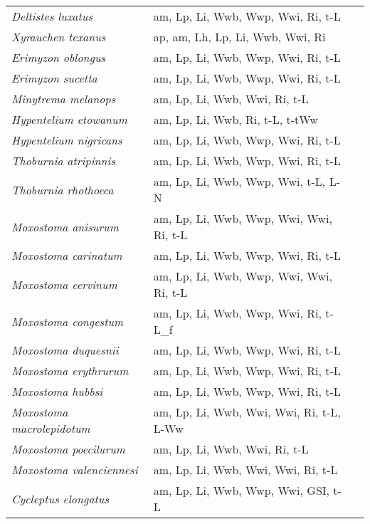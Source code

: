 {\begin{longtable}[c]{p{3.5cm}p{5.5cm}p{5.5cm}}
\emph{Deltistes luxatus} &  am, Lp, Li, Wwb, Wwp, Wwi, Ri, t-L & \citet{TerwReec2010} \\
\emph{Xyrauchen texanus} &  ap, am, Lh, Lp, Li, Wwb, Wwi, Ri & \citet{Bail1969} \\
\emph{Erimyzon oblongus} &  am, Lp, Li, Wwb, Wwp, Wwi, Ri, t-L &  \\
\emph{Erimyzon sucetta} &  am, Lp, Li, Wwb, Wwp, Wwi, Ri, t-L &  \\
\emph{Minytrema melanops} &  am, Lp, Li, Wwb, Wwi, Ri, t-L & \citet{GrabYoun2012} \\
\emph{Hypentelium etowanum} &  am, Lp, Li, Wwb, Ri, t-L, t-tWw & \citet{OKelPowe2007} \\
\emph{Hypentelium nigricans} &  am, Lp, Li, Wwb, Wwp, Wwi, Ri, t-L & \citet{RaneLach1946} \\
\emph{Thoburnia atripinnis} &  am, Lp, Li, Wwb, Wwp, Wwi, Ri, t-L & \citet{TimmRams1983} \\
\emph{Thoburnia rhothoeca} &  am, Lp, Li, Wwb, Wwp, Wwi, t-L, L-N & \citet{RaneLach1946} \\
\emph{Moxostoma anisurum} &  am, Lp, Li, Wwb, Wwp, Wwi, Wwi, Ri, t-L & \citet{MongDumo1992,ThomBent2015} \\
\emph{Moxostoma carinatum} &  am, Lp, Li, Wwb, Wwp, Wwi, Ri, t-L & \citet{BeckHuts2012} \\
\emph{Moxostoma cervinum} &  am, Lp, Li, Wwb, Wwp, Wwi, Wwi, Ri, t-L & \citet{ThomBent2015} \\
\emph{Moxostoma congestum} &  am, Lp, Li, Wwb, Wwp, Wwi, Ri, t-L\_f & \citet{ThomBent2015,ZymoProp2007} \\
\emph{Moxostoma duquesnii} &  am, Lp, Li, Wwb, Wwp, Wwi, Ri, t-L & \citet{Reid2009} \\
\emph{Moxostoma erythrurum} &  am, Lp, Li, Wwb, Wwp, Wwi, Ri, t-L & \citet{MittLewi1989,Keet1963} \\
\emph{Moxostoma hubbsi} &  am, Lp, Li, Wwb, Wwp, Wwi, Ri, t-L & \citet{MongDumo1992,ThomBent2015} \\
\emph{Moxostoma macrolepidotum} &  am, Lp, Li, Wwb, Wwi, Wwi, Ri, t-L, L-Ww & \citet{SuleSkel1985} \\
\emph{Moxostoma poecilurum} &  am, Lp, Li, Wwb, Wwi, Ri, t-L & \citet{GrabYoun2012} \\
\emph{Moxostoma valenciennesi} &  am, Lp, Li, Wwb, Wwi, Wwi, Ri, t-L & \citet{MongDumo1992,ThomBent2015} \\
\emph{Cycleptus elongatus} &  am, Lp, Li, Wwb, Wwp, Wwi, GSI, t-L &  \\

\end{longtable}}
